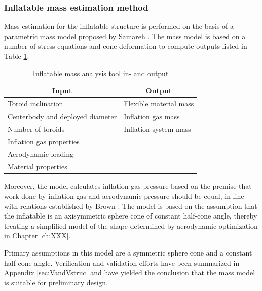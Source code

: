\subsubsection{Inflatable mass estimation method}

Mass estimation for the inflatable structure is performed on the basis of a parametric mass model proposed by Samareh \cite{Samareh2011}. The mass model is based on a number of stress equations and cone deformation to compute outputs listed in Table \ref{tab:inflmass}.
\begin{table}[h]
\caption{Inflatable mass analysis tool in- and output}
\centering
\begin{tabular}{|l||l|}
\hline
\multicolumn{1}{|c||}{{\bf Input}} & \multicolumn{1}{c|}{{\bf Output}} \\ \hline \hline
Toroid inclination         & Flexible material mass            \\ \hline
Centerbody and deployed diameter        & Inflation gas mass                 \\ \hline
Number of toroids                 & Inflation system mass                \\ \hline
Inflation gas properties              &              \\ \hline
Aerodynamic loading               &                                   \\ \hline
Material properties  &                                   \\ \hline
\end{tabular}
\label{tab:inflmass}
\end{table}
Moreover, the model calculates inflation gas pressure based on the premise that work done by inflation gas and aerodynamic pressure should be equal, in line with relations established by Brown \cite{Brown2009}. The model is based on the assumption that the inflatable is an axisymmetric sphere cone of constant half-cone angle, thereby treating a simplified model of the shape determined by aerodynamic optimization in Chapter \ref{ch:XXX}. 

Primary assumptions in this model are a symmetric sphere cone and a constant half-cone angle. Verification and validation efforts have been summarized in Appendix \ref{sec:VandVstruc} and have yielded the conclusion that the mass model is suitable for preliminary design.










